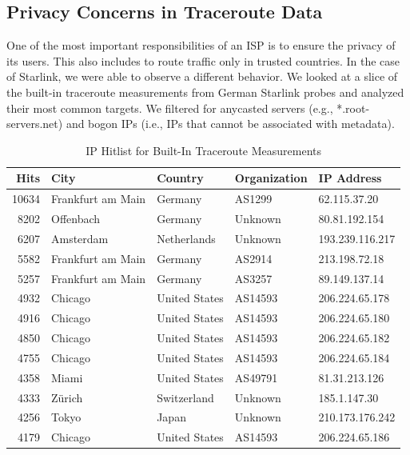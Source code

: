 \subsection{Privacy Concerns in Traceroute Data}

One of the most important responsibilities of an \ac{ISP} is to ensure the privacy of its users. This also includes to route traffic only in trusted countries. In the case of Starlink, we were able to observe a different behavior. We looked at a slice of the built-in traceroute measurements from German Starlink probes and analyzed their most common targets. We filtered for anycasted servers (e.g., *.root-servers.net) and bogon IPs (i.e., IPs that cannot be associated with metadata).

\begin{table}
	\caption{IP Hitlist for Built-In Traceroute Measurements}
	\label{fig:ip-hitlist-traceroute}
	\begin{tabular}{rllll}
		\toprule
		Hits  & City              & Country       & Organization & IP Address      \\
		\midrule
		10634 & Frankfurt am Main & Germany       & AS1299       & 62.115.37.20    \\
		8202  & Offenbach         & Germany       & Unknown      & 80.81.192.154   \\
		6207  & Amsterdam         & Netherlands   & Unknown      & 193.239.116.217 \\
		5582  & Frankfurt am Main & Germany       & AS2914       & 213.198.72.18   \\
		5257  & Frankfurt am Main & Germany       & AS3257       & 89.149.137.14   \\
		4932  & Chicago           & United States & AS14593      & 206.224.65.178  \\
		4916  & Chicago           & United States & AS14593      & 206.224.65.180  \\
		4850  & Chicago           & United States & AS14593      & 206.224.65.182  \\
		4755  & Chicago           & United States & AS14593      & 206.224.65.184  \\
		4358  & Miami             & United States & AS49791      & 81.31.213.126   \\
		4333  & Zürich            & Switzerland   & Unknown      & 185.1.147.30    \\
		4256  & Tokyo             & Japan         & Unknown      & 210.173.176.242 \\
		4179  & Chicago           & United States & AS14593      & 206.224.65.186  \\

\end{tabular}
\end{table}
